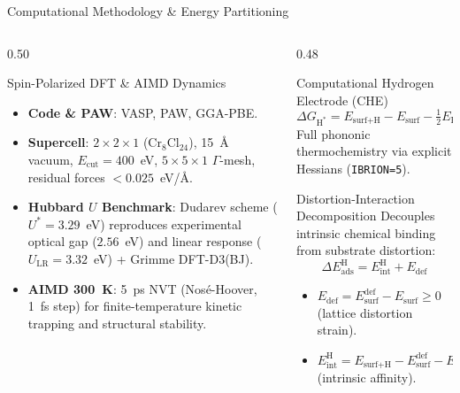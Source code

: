 \documentclass[aspectratio=169]{beamer}
\begin{document}
\begin{frame}{Computational Methodology \& Energy Partitioning}
  \begin{columns}[c]
    \begin{column}{0.50\textwidth}
      \begin{block}{Spin-Polarized DFT \& AIMD Dynamics}
        \scriptsize
      \begin{itemize}\setlength{\itemsep}{1.2pt}
          \item \textbf{Code \& PAW}: VASP, PAW, GGA-PBE.
          \item \textbf{Supercell}: $2\times 2\times 1$ ($\text{Cr}_8\text{Cl}_{24}$), 15~\AA{} vacuum, $E_{\text{cut}} = 400$~eV, $5\times 5\times 1$ $\Gamma$-mesh, residual forces $< 0.025$~eV/\AA.
          \item \textbf{Hubbard $U$ Benchmark}: Dudarev scheme ($U^* = 3.29$~eV) reproduces experimental optical gap ($2.56$~eV) and linear response ($U_{\text{LR}} = 3.32$~eV) + Grimme DFT-D3(BJ).
          \item \textbf{AIMD 300~K}: 5~ps NVT (Nosé-Hoover, 1~fs step) for finite-temperature kinetic trapping and structural stability.
        \end{itemize}
      \end{block}
    \end{column}

    \begin{column}{0.48\textwidth}
      \begin{exampleblock}{Computational Hydrogen Electrode (CHE)}
        \scriptsize
        \[
          \Delta G_{\text{H}^*} = E_{\text{surf+H}} - E_{\text{surf}} - \tfrac{1}{2}E_{\text{H}_2} + (\Delta E_{\text{ZPE}} - T\Delta S)
        \]
        Full phononic thermochemistry via explicit Hessians (\texttt{IBRION=5}).
      \end{exampleblock}
      \vspace{0.1em}
      \begin{alertblock}{Distortion-Interaction Decomposition}
        \scriptsize
        Decouples intrinsic chemical binding from substrate distortion:
        \[
          \Delta E_{\text{ads}}^{\text{H}} = E_{\text{int}}^{\text{H}} + E_{\text{def}}
        \]
      \begin{itemize}\setlength{\itemsep}{0.6pt}
          \item $E_{\text{def}} = E_{\text{surf}}^{\text{def}} - E_{\text{surf}} \ge 0$ (lattice distortion strain).
          \item $E_{\text{int}}^{\text{H}} = E_{\text{surf+H}} - E_{\text{surf}}^{\text{def}} - E_{\text{H}} < 0$ (intrinsic affinity).
        \end{itemize}
      \end{alertblock}
    \end{column}
  \end{columns}
\end{frame}
\end{document}
